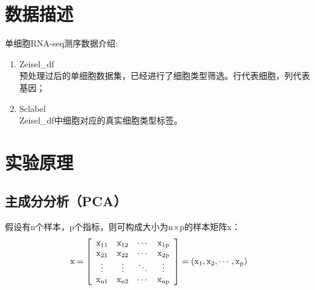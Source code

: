 \documentclass {article}
\begin{document}
	\section{数据描述}
	单细胞RNA-seq测序数据介绍:
	\begin{enumerate}
		\item Zeisel\_df \\
		预处理过后的单细胞数据集，已经进行了细胞类型筛选。行代表细胞，列代表基因；
		\item Sclabel \\
		Zeisel\_df中细胞对应的真实细胞类型标签。
	\end{enumerate}
	
	\section{实验原理}
	\subsection{主成分分析（PCA）}
	\label{PCA算法原理}
	假设有n个样本，p个指标，则可构成大小为n×p的样本矩阵x：
	\begin{equation}
		\centering
		\mathrm{x}=\left[\begin{array}{cccc}
			\mathrm{x}_{11} & \mathrm{x}_{12} & \cdots & \mathrm{x}_{1 \mathrm{p}} \\
			\mathrm{x}_{21} & \mathrm{x}_{22} & \cdots & \mathrm{x}_{2 \mathrm{p}} \\
			\vdots & \vdots & \ddots & \vdots \\
			\mathrm{x}_{\mathrm{n} 1} & \mathrm{x}_{\mathrm{n} 2} & \cdots & \mathrm{x}_{\mathrm{np}}
		\end{array}\right]=\left(\mathrm{x}_1, \mathrm{x}_2, \cdots, \mathrm{x}_{\mathrm{p}}\right)
	\end{equation}
	
\end{document}
